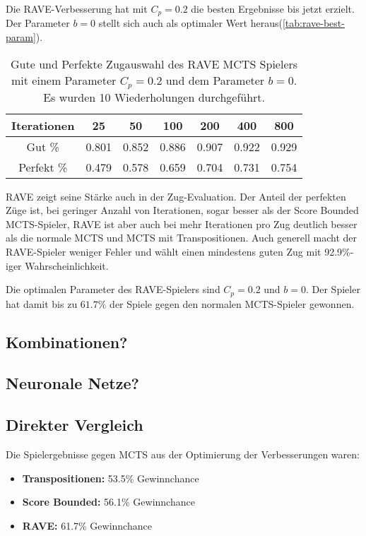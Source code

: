 Die RAVE-Verbesserung hat mit $C_p=0.2$ die besten Ergebnisse bis jetzt erzielt. Der Parameter $b=0$ stellt sich auch als optimaler Wert heraus(\cref{tab:rave-best-param}).


\begin{table}[h!]
	\centering
	\begin{tabular}{|c||c|c|c|c|c|c|}
		\hline
		Iterationen & 25 & 50 & 100 & 200 & 400 & 800 \\
		\hline
		Gut \% & 0.801 & 0.852 & 0.886 & 0.907 & 0.922 & 0.929 \\
		\hline
		Perfekt \% & 0.479 & 0.578 & 0.659 & 0.704 & 0.731 & 0.754 \\
		\hline
	\end{tabular}
	\caption{Gute und Perfekte Zugauswahl des RAVE MCTS Spielers mit einem Parameter $C_p=0.2$ und dem Parameter $b=0$. Es wurden 10 Wiederholungen durchgeführt.}
	\label{tab:rave-move-eval}
\end{table}

RAVE zeigt seine Stärke auch in der Zug-Evaluation.
Der Anteil der perfekten Züge ist, bei geringer Anzahl von Iterationen, sogar besser als der Score Bounded MCTS-Spieler, RAVE ist aber auch bei mehr Iterationen pro Zug deutlich besser als die normale MCTS und MCTS mit Transpositionen.
Auch generell macht der RAVE-Spieler weniger Fehler und wählt einen mindestens guten Zug mit 92.9\%-iger Wahrscheinlichkeit.


\bigskip
Die optimalen Parameter des RAVE-Spielers sind $C_p=0.2$ und $b=0$. Der Spieler hat damit bis zu $61.7\%$ der Spiele gegen den normalen MCTS-Spieler gewonnen.


\pagebreak[3]
\subsection{Kombinationen?}

\pagebreak[1]
\subsection{Neuronale Netze?}


\subsection{Direkter Vergleich}
Die Spielergebnisse gegen MCTS aus der Optimierung der Verbesserungen waren:

\begin{itemize}
	\item \textbf{Transpositionen:} 53.5\% Gewinnchance
	\item \textbf{Score Bounded:} 56.1\% Gewinnchance
	\item \textbf{RAVE:} 61.7\% Gewinnchance
\end{itemize}

